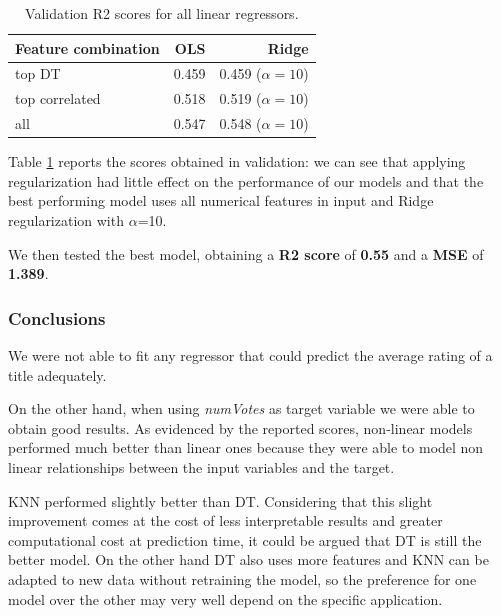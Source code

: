 \begin{table}
    \begin{tabular}{lrr}
        \toprule
        Feature combination & OLS & Ridge\\
        \midrule
        top DT & 0.459 & 0.459 ($\alpha=10$)\\
        top correlated & 0.518 & 0.519 ($\alpha=10$)\\
        all & 0.547 & 0.548 ($\alpha=10$) \\
        \bottomrule
    \end{tabular}
    \caption{Validation R2 scores for all linear regressors.}
    \label{tab:linear_regression_validation}
\end{table}

Table \ref{tab:linear_regression_validation} reports the scores obtained in validation: we can see that applying regularization had little effect on the performance of our models and that the best performing model uses all numerical features in input and Ridge regularization with $\alpha$=10.

We then tested the best model, obtaining a \textbf{R2 score} of \textbf{0.55} and a \textbf{MSE} of \textbf{1.389}.

\subsubsection{Conclusions}
We were not able to fit any regressor that could predict the average rating of a title adequately.

On the other hand, when using \emph{numVotes} as target variable we were able to obtain good results.
As evidenced by the reported scores, non-linear models performed much better than linear ones because they were able to model non linear relationships between the input variables and the target.

KNN performed slightly better than DT.
Considering that this slight improvement comes at the cost of less interpretable results and greater computational cost at prediction time, it could be argued that DT is still the better model.
On the other hand DT also uses more features and KNN can be adapted to new data without retraining the model, so the preference for one model over the other may very well depend on the specific application.